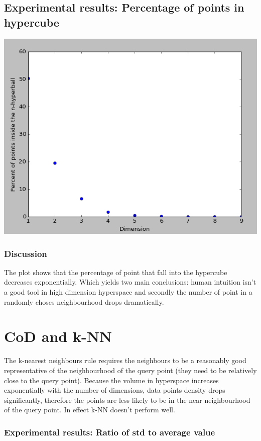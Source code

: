 \documentclass{article}
\begin{document}
\subsection{Experimental results: Percentage of points in hypercube}

\includegraphics[width=\textwidth]{points}

\subsubsection{Discussion}

The plot shows that the percentage of point that fall into the hypercube decreases exponentially. Which
yields two main conclusions: human intuition isn't a good tool in high dimension hyperspace and secondly
the number of point in a randomly choses neighbourhood drops dramatically.

\section{CoD and k-NN}

The k-nearest neighbours rule requires the neighbours to be a reasonably good representative of the neighbourhood of the query point (they need to be relatively close to the query point).
Because the volume in hyperspace increases exponentially with the number of dimensions, data points density drops significantly, therefore the points are less likely to be in the near neighbourhood of the query point. In effect k-NN doesn't perform well.

\subsubsection{Experimental results: Ratio of std to average value}
\end{document}

